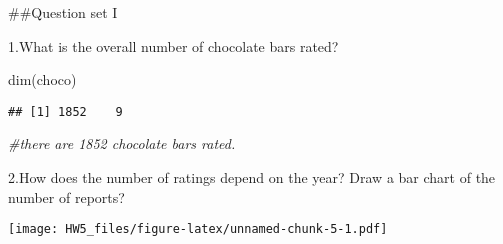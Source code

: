\documentclass[
]{article}
\newenvironment{Shaded}{\begin{snugshade}}{\end{snugshade}}
\newcommand{\AttributeTok}[1]{\textcolor[rgb]{0.77,0.63,0.00}{#1}}
\newcommand{\CommentTok}[1]{\textcolor[rgb]{0.56,0.35,0.01}{\textit{#1}}}
\newcommand{\ControlFlowTok}[1]{\textcolor[rgb]{0.13,0.29,0.53}{\textbf{#1}}}
\newcommand{\DecValTok}[1]{\textcolor[rgb]{0.00,0.00,0.81}{#1}}
\newcommand{\FunctionTok}[1]{\textcolor[rgb]{0.00,0.00,0.00}{#1}}
\newcommand{\NormalTok}[1]{#1}
\newcommand{\OtherTok}[1]{\textcolor[rgb]{0.56,0.35,0.01}{#1}}
\newcommand{\SpecialCharTok}[1]{\textcolor[rgb]{0.00,0.00,0.00}{#1}}
\newcommand{\StringTok}[1]{\textcolor[rgb]{0.31,0.60,0.02}{#1}}
\begin{document}
\#\#Question set I

1.What is the overall number of chocolate bars rated?

\begin{Shaded}
\begin{Highlighting}[]
\FunctionTok{dim}\NormalTok{(choco)}
\end{Highlighting}
\end{Shaded}

\begin{verbatim}
## [1] 1852    9
\end{verbatim}

\begin{Shaded}
\begin{Highlighting}[]
\CommentTok{\#there are 1852 chocolate bars rated.}
\end{Highlighting}
\end{Shaded}

2.How does the number of ratings depend on the year? Draw a bar chart of
the number of reports?

\begin{Shaded}
\end{Shaded}

\texttt{[image: HW5\_files/figure-latex/unnamed-chunk-5-1.pdf]}
\end{document}
